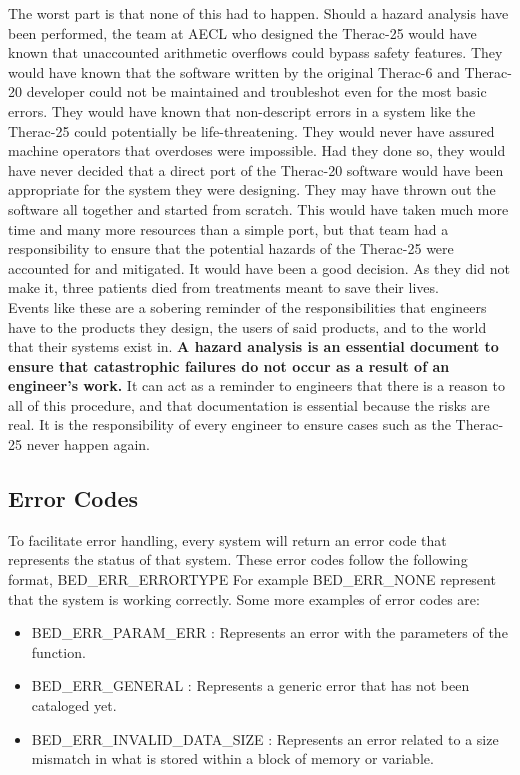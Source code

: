 \documentclass{article}
\begin{document}
The worst part is that none of this had to happen. Should a hazard analysis have been performed, the team at AECL who designed the Therac-25 would have known that unaccounted arithmetic overflows could bypass safety features. They would have known that the software written by the original Therac-6 and Therac-20 developer could not be maintained and troubleshot even for the most basic errors. They would have known that non-descript errors in a system like the Therac-25 could potentially be life-threatening. They would never have assured machine operators that overdoses were impossible. Had they done so, they would have never decided that a direct port of the Therac-20 software would have been appropriate for the system they were designing. They may have thrown out the software all together and started from scratch. This would have taken much more time and many more resources than a simple port, but that team had a responsibility to ensure that the potential hazards of the Therac-25 were accounted for and mitigated. It would have been a good decision. As they did not make it, three patients died from treatments meant to save their lives.\cite{rose_1994}\\

Events like these are a sobering reminder of the responsibilities that engineers have to the products they design, the users of said products, and to the world that their systems exist in. \textbf{A hazard analysis is an essential document to ensure that catastrophic failures do not occur as a result of an engineer's work.} It can act as a reminder to engineers that there is a reason to all of this procedure, and that documentation is essential because the risks are real. It is the responsibility of every engineer to ensure cases such as the Therac-25 never happen again.\\


\subsection*{Error Codes}
To facilitate error handling, every system will return an error code that represents the status of that system. These error codes follow the following format, BED\_ERR\_ERRORTYPE
For example BED\_ERR\_NONE represent that the system is working correctly. Some more examples of error codes are:
\begin{itemize}
	\item BED\_ERR\_PARAM\_ERR		 	: Represents an error with the parameters of the function.
	\item BED\_ERR\_GENERAL			 	: Represents a generic error that has not been cataloged yet.
	\item BED\_ERR\_INVALID\_DATA\_SIZE	: Represents an error related to a size mismatch in what is stored within a block of memory or variable.
\end{itemize}
\end{document}
